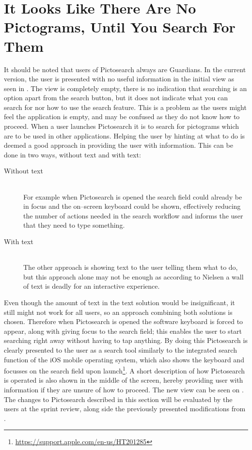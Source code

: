 \section{It Looks Like There Are No Pictograms, Until You Search For Them}\label{untilSearch}
\begin{center}
\end{center}

It should be noted that users of Pictosearch always are Guardians.
In the current version, the user is presented with no useful information in the initial view as seen in .
The view is completely empty, there is no indication that searching is an option apart from the search button, but it does not indicate what you can search for nor how to use the search feature.
This is a problem as the users might feel the application is empty, and may be confused as they do not know how to proceed.
When a user launches Pictosearch it is to search for pictograms which are to be used in other applications.
Helping the user by hinting at what to do is deemed a good approach in providing the user with information.
This can be done in two ways, without text and with text:
\begin{description}
    \item [Without text] \hfill\\
    For example when Pictosearch is opened the search field could already be in focus and the on--screen keyboard could be shown, effectively reducing the number of actions needed in the search workflow and informs the user that they need to type something.
    \item [With text] \hfill\\
    The other approach is showing text to the user telling them what to do, but this approach alone may not be enough as according to Nielsen \cite{nielsen2003usability} a wall of text is deadly for an interactive experience.
\end{description}

Even though the amount of text in the text solution would be insignificant, it still might not work for all users, so an approach combining both solutions is chosen.
Therefore when Pictosearch is opened the software keyboard is forced to appear, along with giving focus to the search field; this enables the user to start searching right away without having to tap anything.
By doing this Pictosearch is clearly presented to the user as a search tool similarly to the integrated search function of the iOS mobile operating system, which also shows the keyboard and focusses on the search field upon launch\footnote{\url{https://support.apple.com/en-us/HT201285}}.
A short description of how Pictosearch is operated is also shown in the middle of the screen, hereby providing user with information if they are unsure of how to proceed.
The new view can be seen on .
The changes to Pictosearch described in this section will be evaluated by the users at the sprint review, along side the previously presented modifications from .
